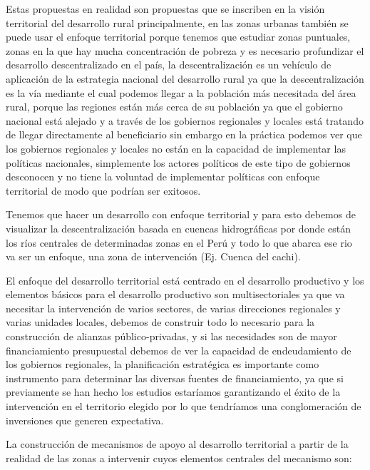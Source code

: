 \documentclass[
  jou,
  floatsintext,
  longtable,
  a4paper,
  nolmodern,
  notxfonts,
  notimes,
  12pt,
  colorlinks=true,linkcolor=blue,citecolor=blue,urlcolor=blue]{apa7}
\begin{document}
Estas propuestas en realidad son propuestas que se inscriben en la
visión territorial del desarrollo rural principalmente, en las zonas
urbanas también se puede usar el enfoque territorial porque tenemos que
estudiar zonas puntuales, zonas en la que hay mucha concentración de
pobreza y es necesario profundizar el desarrollo descentralizado en el
país, la descentralización es un vehículo de aplicación de la estrategia
nacional del desarrollo rural ya que la descentralización es la vía
mediante el cual podemos llegar a la población más necesitada del área
rural, porque las regiones están más cerca de su población ya que el
gobierno nacional está alejado y a través de los gobiernos regionales y
locales está tratando de llegar directamente al beneficiario sin embargo
en la práctica podemos ver que los gobiernos regionales y locales no
están en la capacidad de implementar las políticas nacionales,
simplemente los actores políticos de este tipo de gobiernos desconocen y
no tiene la voluntad de implementar políticas con enfoque territorial de
modo que podrían ser exitosos.

Tenemos que hacer un desarrollo con enfoque territorial y para esto
debemos de visualizar la descentralización basada en cuencas
hidrográficas por donde están los ríos centrales de determinadas zonas
en el Perú y todo lo que abarca ese rio va ser un enfoque, una zona de
intervención (Ej. Cuenca del cachi).

El enfoque del desarrollo territorial está centrado en el desarrollo
productivo y los elementos básicos para el desarrollo productivo son
multisectoriales ya que va necesitar la intervención de varios sectores,
de varias direcciones regionales y varias unidades locales, debemos de
construir todo lo necesario para la construcción de alianzas
público-privadas, y si las necesidades son de mayor financiamiento
presupuestal debemos de ver la capacidad de endeudamiento de los
gobiernos regionales, la planificación estratégica es importante como
instrumento para determinar las diversas fuentes de financiamiento, ya
que si previamente se han hecho los estudios estaríamos garantizando el
éxito de la intervención en el territorio elegido por lo que tendríamos
una conglomeración de inversiones que generen expectativa.

La construcción de mecanismos de apoyo al desarrollo territorial a
partir de la realidad de las zonas a intervenir cuyos elementos
centrales del mecanismo son:
\end{document}
